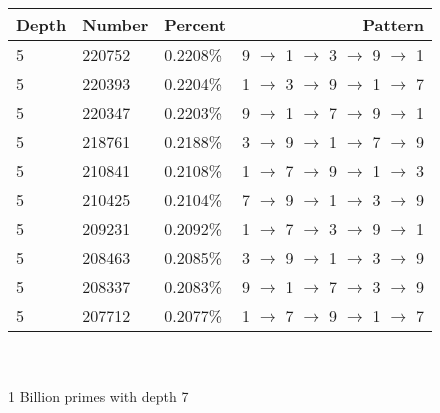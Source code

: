 \documentclass[13pt]{article}
\begin{document}
\begin{tabular}{ l l l r }
  Depth & Number & Percent & Pattern \\
  \hline
  5 & 220752 & 0.2208\% & 9 $\rightarrow$ 1 $\rightarrow$ 3 $\rightarrow$ 9 $\rightarrow$ 1\\
  5 & 220393 & 0.2204\% & 1 $\rightarrow$ 3 $\rightarrow$ 9 $\rightarrow$ 1 $\rightarrow$ 7\\
  5 & 220347 & 0.2203\% & 9 $\rightarrow$ 1 $\rightarrow$ 7 $\rightarrow$ 9 $\rightarrow$ 1\\
  5 & 218761 & 0.2188\% & 3 $\rightarrow$ 9 $\rightarrow$ 1 $\rightarrow$ 7 $\rightarrow$ 9\\
  5 & 210841 & 0.2108\% & 1 $\rightarrow$ 7 $\rightarrow$ 9 $\rightarrow$ 1 $\rightarrow$ 3\\
  5 & 210425 & 0.2104\% & 7 $\rightarrow$ 9 $\rightarrow$ 1 $\rightarrow$ 3 $\rightarrow$ 9\\
  5 & 209231 & 0.2092\% & 1 $\rightarrow$ 7 $\rightarrow$ 3 $\rightarrow$ 9 $\rightarrow$ 1\\
  5 & 208463 & 0.2085\% & 3 $\rightarrow$ 9 $\rightarrow$ 1 $\rightarrow$ 3 $\rightarrow$ 9\\
  5 & 208337 & 0.2083\% & 9 $\rightarrow$ 1 $\rightarrow$ 7 $\rightarrow$ 3 $\rightarrow$ 9\\
  5 & 207712 & 0.2077\% & 1 $\rightarrow$ 7 $\rightarrow$ 9 $\rightarrow$ 1 $\rightarrow$ 7\\
\end{tabular}
\\\\1 Billion primes with depth 7\\\\
\end{document}
